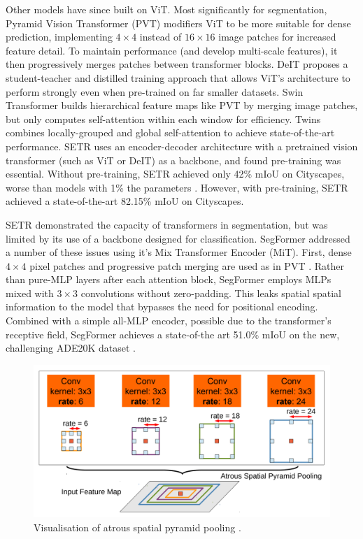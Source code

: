 \documentclass[a4paper,12pt]{report}
\begin{document}
Other models have since built on ViT. Most significantly for segmentation, Pyramid Vision Transformer (PVT) \cite{wang_pyramid_2021} modifiers ViT to be more suitable for dense prediction, implementing $4 \times 4$ instead of $16 \times 16$ image patches for increased feature detail. To maintain performance (and develop multi-scale features), it then progressively merges patches between transformer blocks. DeIT \cite{touvron_training_2021} proposes a student-teacher and distilled training approach that allows ViT’s architecture to perform strongly even when pre-trained on far smaller datasets. Swin Transformer \cite{liu_swin_2021} builds hierarchical feature maps like PVT by merging image patches, but only computes self-attention within each window for efficiency. Twins \cite{chu_twins_2021} combines locally-grouped and global self-attention to achieve state-of-the-art performance. SETR \cite{zheng_rethinking_2021} uses an encoder-decoder architecture with a pretrained vision transformer (such as ViT or DeIT) as a backbone, and found pre-training was essential. Without pre-training, SETR achieved only 42\% mIoU on Cityscapes, worse than models with 1\% the parameters \cite{paszke_enet_2016}. However, with pre-training, SETR achieved a state-of-the-art 82.15\% mIoU on Cityscapes.

SETR demonstrated the capacity of transformers in segmentation, but was limited by its use of a backbone designed for classification. SegFormer \cite{xie_segformer_2021} addressed a number of these issues using it’s Mix Transformer Encoder (MiT). First, dense $4 \times 4$ pixel patches and progressive patch merging are used as in PVT \cite{wang_pyramid_2021}. Rather than pure-MLP layers after each attention block, SegFormer employs MLPs mixed with $3 \times 3$ convolutions without zero-padding. This leaks spatial spatial information to the model that bypasses the need for positional encoding. Combined with a simple all-MLP encoder, possible due to the transformer’s receptive field, SegFormer achieves a state-of-the art 51.0\% mIoU on the new, challenging ADE20K dataset \cite{zhou_semantic_2018}.

\begin{figure}[t]
    \centering
    \includegraphics[scale=0.5]{res/deeplab-aspp.png}
    \caption{Visualisation of atrous spatial pyramid pooling \cite{chen_deeplab_2017}.}
    \label{fig:deeplab_aspp}
\end{figure}
\end{document}
